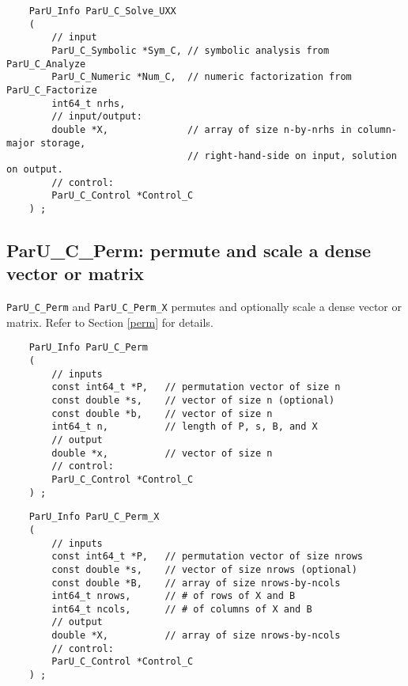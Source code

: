 \documentclass[12pt]{article}
\begin{document}
    {\footnotesize
    \begin{verbatim}
    ParU_Info ParU_C_Solve_UXX
    (
        // input
        ParU_C_Symbolic *Sym_C, // symbolic analysis from ParU_C_Analyze
        ParU_C_Numeric *Num_C,  // numeric factorization from ParU_C_Factorize
        int64_t nrhs,
        // input/output:
        double *X,              // array of size n-by-nrhs in column-major storage,
                                // right-hand-side on input, solution on output.
        // control:
        ParU_C_Control *Control_C
    ) ; \end{verbatim} }

\subsection{{\sf ParU\_C\_Perm}: permute and scale a dense vector or matrix}

    \verb'ParU_C_Perm' and \verb'ParU_C_Perm_X' permutes and optionally scale a
    dense vector or matrix.  Refer to Section \ref{perm} for details.

    {\footnotesize
    \begin{verbatim}
    ParU_Info ParU_C_Perm
    (
        // inputs
        const int64_t *P,   // permutation vector of size n
        const double *s,    // vector of size n (optional)
        const double *b,    // vector of size n
        int64_t n,          // length of P, s, B, and X
        // output
        double *x,          // vector of size n
        // control:
        ParU_C_Control *Control_C
    ) ; \end{verbatim} }

    {\footnotesize
    \begin{verbatim}
    ParU_Info ParU_C_Perm_X
    (
        // inputs
        const int64_t *P,   // permutation vector of size nrows
        const double *s,    // vector of size nrows (optional)
        const double *B,    // array of size nrows-by-ncols
        int64_t nrows,      // # of rows of X and B
        int64_t ncols,      // # of columns of X and B
        // output
        double *X,          // array of size nrows-by-ncols
        // control:
        ParU_C_Control *Control_C
    ) ; \end{verbatim} }

\end{document}

